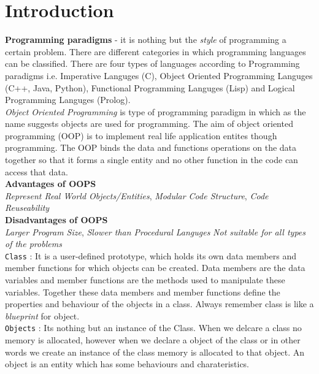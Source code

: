 \documentclass[oops.tex]{subfiles}
\begin{document}
\section{Introduction}

{\bf Programming paradigms} - it is nothing but the \emph{style} of programming 
a certain problem. There are different categories in which programming languages
can be classified. There are four types of languages according to Programming
paradigms i.e. Imperative Languges (C), Object Oriented Programming Languges (C++,
Java, Python), Functional Programming Languges (Lisp) and Logical Programming
Languges (Prolog).\\

\emph{Object Oriented Programming} is type of programming paradigm in which as the name 
suggests objects are used for programming. The aim of object oriented programming 
(OOP) is to implement real life application entites though programming. The OOP binds 
the data and functions operations on the data together so that it forms a single
entity and no other function in the code can access that data.\\

{\bf Advantages of OOPS}\\
\emph{Represent Real World Objects/Entities}, \emph{Modular Code Structure},
\emph{Code Reuseability}\\

{\bf Disadvantages of OOPS}\\
\emph{Larger Program Size}, \emph{Slower than Procedural Languges}
\emph{Not suitable for all types of the problems}\\

\texttt{Class} : It is a user-defined prototype, which holds its own data members 
and member functions for which objects can be created. Data members are the
data variables and member functions are the methods used to manipulate these variables. 
Together these data members and member functions define the properties and behaviour 
of the objects in a class. Always remember class is like a \emph{blueprint} for
object.\\

\texttt{Objects} : Its nothing but an instance of the Class. When we delcare a
class no memory is allocated, however when we declare a object of the class or
in other words we create an instance of the class memory is allocated to that
object. An object is an entity which has some behaviours and charateristics.\\
\end{document}

